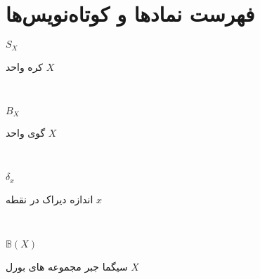 \thispagestyle{empty}
 \def\namad#1#2{\parbox[t]{12mm}{#1}\parbox[t]{5.2cm}{#2}\\}



\chapter*{فهرست نمادها و کوتاه‌نویس‌ها}
{}

\begin{multicols}{2} 
 \noindent
\namad{$S_X$}{کره واحد $X$ }
\namad{$B_X$}{گوی واحد $X$} 
\namad{$\delta_x$}{اندازه دیراک در نقطه $x$}
\namad{$\mathbb{B}(X)$}{سیگما جبر مجموعه های بورل $X$}
\namad{}{}
\end{multicols}

